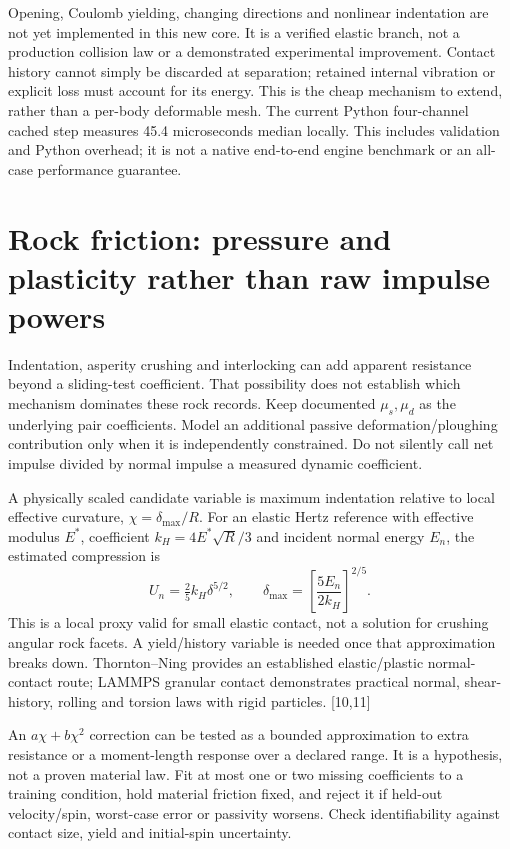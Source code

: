\documentclass[10pt,a4paper]{article}
\begin{document}
Opening, Coulomb yielding, changing directions and nonlinear indentation are not yet
implemented in this new core. It is a verified elastic branch, not a production
collision law or a demonstrated experimental improvement. Contact history cannot
simply be discarded at separation; retained internal vibration or explicit loss
must account for its energy. This is the cheap mechanism to extend, rather than a
per-body deformable mesh.
The current Python four-channel cached step measures 45.4 microseconds median locally. This includes validation and Python overhead; it is not a native end-to-end engine benchmark or an all-case performance guarantee.

\newpage
\section*{Rock friction: pressure and plasticity rather than raw impulse powers}

Indentation, asperity crushing and interlocking can add apparent resistance beyond
a sliding-test coefficient. That possibility does not establish which mechanism
dominates these rock records. Keep documented $\mu_s,\mu_d$ as the underlying pair
coefficients. Model an additional passive deformation/ploughing contribution only
when it is independently constrained. Do not silently call net impulse divided by
normal impulse a measured dynamic coefficient.

A physically scaled candidate variable is maximum indentation relative to local
effective curvature, $\chi=\delta_{\max}/R$. For an elastic Hertz reference with
effective modulus $E^*$, coefficient $k_H=4E^*\sqrt R/3$ and incident normal energy
$E_n$, the estimated compression is
\[
 U_n=\tfrac25 k_H\delta^{5/2},\qquad
 \delta_{\max}=\left[\frac{5E_n}{2k_H}\right]^{2/5}.
\]
This is a local proxy valid for small elastic contact, not a solution for crushing
angular rock facets. A yield/history variable is needed once that approximation
breaks down. Thornton--Ning provides an established elastic/plastic normal-contact
route; LAMMPS granular contact demonstrates practical normal, shear-history,
rolling and torsion laws with rigid particles. [10,11]

An $a\chi+b\chi^2$ correction can be tested as a bounded approximation to extra
resistance or a moment-length response over a declared range. It is a hypothesis,
not a proven material law. Fit at most one or two missing coefficients to a training
condition, hold material friction fixed, and reject it if held-out velocity/spin,
worst-case error or passivity worsens. Check identifiability against contact size,
yield and initial-spin uncertainty.
\end{document}
